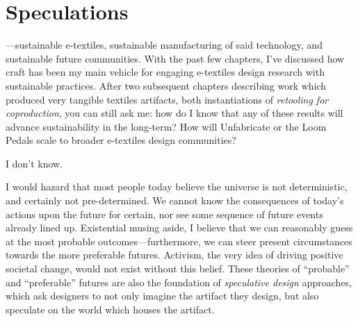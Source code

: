 
\chapter{Speculations}
\label{ch_speculations}

---sustainable e-textiles, sustainable manufacturing of said technology, and sustainable future communities. With the past few chapters, I've discussed how craft has been my main vehicle for engaging e-textiles design research with sustainable practices. After two subsequent chapters describing work which produced very tangible textiles artifacts, both instantiations of \textit{retooling for coproduction}, you can still ask me: how do I know that any of these results will advance sustainability in the long-term? How will Unfabricate or the Loom Pedals scale to broader e-textiles design communities?

I don't know.

I would hazard that most people today believe the universe is not deterministic, and certainly not pre-determined. We cannot know the consequences of today's actions upon the future for certain, nor see some sequence of future events already lined up. Existential musing aside, I believe that we can reasonably guess at the most probable outcomes---furthermore, we can steer present circumstances towards the more preferable futures. Activism, the very idea of driving positive societal change, would not exist without this belief. These theories of ``probable'' and ``preferable'' futures are also the foundation of \textit{speculative design} approaches, which ask designers to not only imagine the artifact they design, but also speculate on the world which houses the artifact.

\section{}


